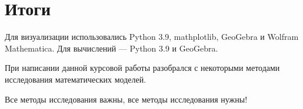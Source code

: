 \section{Итоги}



    Для визуализации использовались Python 3.9, mathplotlib, GeoGebra и Wolfram Mathematica. Для вычислений --- Python 3.9 и GeoGebra.

    При написании данной курсовой работы разобрался с некоторыми методами исследования математических моделей.

    Все методы исследования важны, все методы исследования нужны!
